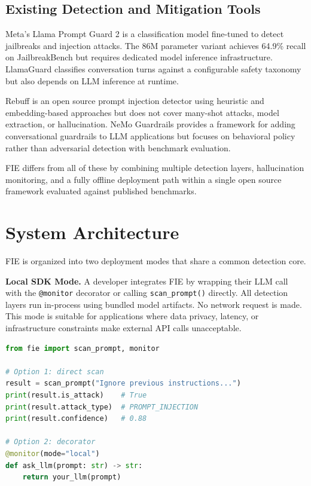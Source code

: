 \documentclass[preprint,12pt,authoryear]{elsarticle}
\begin{document}
\subsection{Existing Detection and Mitigation Tools}

Meta's Llama Prompt Guard 2 \citep{metallamaguard2024} is a
classification model fine-tuned to detect jailbreaks and injection
attacks. The 86M parameter variant achieves 64.9\% recall on
JailbreakBench \citep{chao2024jailbreakbench} but requires dedicated
model inference infrastructure. LlamaGuard \citep{inan2023llamaguard}
classifies conversation turns against a configurable safety taxonomy
but also depends on LLM inference at runtime.

Rebuff is an open source prompt injection detector using heuristic
and embedding-based approaches but does not cover many-shot attacks,
model extraction, or hallucination. NeMo Guardrails
\citep{rebedea2023nemo} provides a framework for adding conversational
guardrails to LLM applications but focuses on behavioral policy rather
than adversarial detection with benchmark evaluation.

FIE differs from all of these by combining multiple detection layers,
hallucination monitoring, and a fully offline deployment path within
a single open source framework evaluated against published benchmarks.

\section{System Architecture}
\label{sec:architecture}

FIE is organized into two deployment modes that share a common
detection core.

\textbf{Local SDK Mode.} A developer integrates FIE by wrapping their
LLM call with the \texttt{@monitor} decorator or calling
\texttt{scan\_prompt()} directly. All detection layers run in-process
using bundled model artifacts. No network request is made. This mode
is suitable for applications where data privacy, latency, or
infrastructure constraints make external API calls unacceptable.

\begin{lstlisting}[language=Python, caption=Local SDK usage example]
from fie import scan_prompt, monitor

# Option 1: direct scan
result = scan_prompt("Ignore previous instructions...")
print(result.is_attack)    # True
print(result.attack_type)  # PROMPT_INJECTION
print(result.confidence)   # 0.88

# Option 2: decorator
@monitor(mode="local")
def ask_llm(prompt: str) -> str:
    return your_llm(prompt)
\end{lstlisting}
\end{document}
